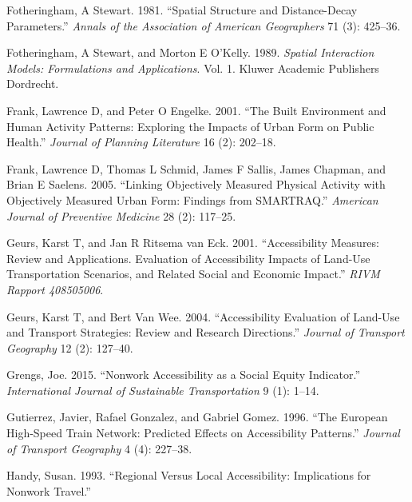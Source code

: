 \documentclass[preprint, 3p,
authoryear]{elsarticle} %
\newlength{\cslhangindent}
\newlength{\cslentryspacingunit} %
\newenvironment{CSLReferences}[2] %
 {%
  \setlength{\parindent}{0pt}
  \ifodd #1
  \let\oldpar\par
  \def\par{\hangindent=\cslhangindent\oldpar}
  \fi
  \setlength{\parskip}{#2\cslentryspacingunit}
 }%
 {}
\begin{document}
\begin{CSLReferences}{1}{0}
\leavevmode{}%
Fotheringham, A Stewart. 1981. {``Spatial Structure and Distance-Decay
Parameters.''} \emph{Annals of the Association of American Geographers}
71 (3): 425--36.

\leavevmode{}%
Fotheringham, A Stewart, and Morton E O'Kelly. 1989. \emph{Spatial
Interaction Models: Formulations and Applications}. Vol. 1. Kluwer
Academic Publishers Dordrecht.

\leavevmode{}%
Frank, Lawrence D, and Peter O Engelke. 2001. {``The Built Environment
and Human Activity Patterns: Exploring the Impacts of Urban Form on
Public Health.''} \emph{Journal of Planning Literature} 16 (2): 202--18.

\leavevmode{}%
Frank, Lawrence D, Thomas L Schmid, James F Sallis, James Chapman, and
Brian E Saelens. 2005. {``Linking Objectively Measured Physical Activity
with Objectively Measured Urban Form: Findings from SMARTRAQ.''}
\emph{American Journal of Preventive Medicine} 28 (2): 117--25.

\leavevmode{}%
Geurs, Karst T, and Jan R Ritsema van Eck. 2001. {``Accessibility
Measures: Review and Applications. Evaluation of Accessibility Impacts
of Land-Use Transportation Scenarios, and Related Social and Economic
Impact.''} \emph{RIVM Rapport 408505006}.

\leavevmode{}%
Geurs, Karst T, and Bert Van Wee. 2004. {``Accessibility Evaluation of
Land-Use and Transport Strategies: Review and Research Directions.''}
\emph{Journal of Transport Geography} 12 (2): 127--40.

\leavevmode{}%
Grengs, Joe. 2015. {``Nonwork Accessibility as a Social Equity
Indicator.''} \emph{International Journal of Sustainable Transportation}
9 (1): 1--14.

\leavevmode{}%
Gutierrez, Javier, Rafael Gonzalez, and Gabriel Gomez. 1996. {``The
European High-Speed Train Network: Predicted Effects on Accessibility
Patterns.''} \emph{Journal of Transport Geography} 4 (4): 227--38.

\leavevmode{}%
Handy, Susan. 1993. {``Regional Versus Local Accessibility: Implications
for Nonwork Travel.''}


\end{CSLReferences}
\end{document}
